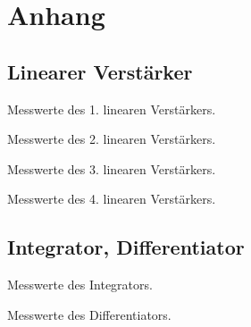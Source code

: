 \section*{Anhang}\label{sec:anhang}

\subsection*{Linearer Verst\"arker}

\begin{table}[ht]
  \centering
  \caption{Messwerte des 1. linearen Verstärkers.}
  \label{tab:lin_verst_01}
  
\end{table}

\begin{table}[ht]
  \centering
  \caption{Messwerte des 2. linearen Verstärkers.}
  \label{tab:lin_verst_02}
  
\end{table}

\begin{table}[ht]
  \centering
  \caption{Messwerte des 3. linearen Verstärkers.}
  \label{tab:lin_verst_03}
  
\end{table}

\begin{table}[ht]
  \centering
  \caption{Messwerte des 4. linearen Verstärkers.}
  \label{tab:lin_verst_04}
  
\end{table}

\FloatBarrier
\newpage
\subsection*{Integrator, Differentiator}

\begin{table}[ht]
  \centering
  \caption{Messwerte des Integrators.}
  \label{tab:int}
  
\end{table}

\begin{table}[ht]
  \centering
  \caption{Messwerte des Differentiators.}
  \label{tab:dif}
  
\end{table}

\FloatBarrier
\newpage

